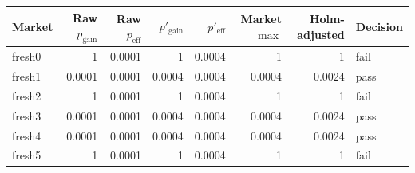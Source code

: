 \begin{tabular}{@{}lrrrrrrl@{}}\toprule
Market & Raw $p_{\mathrm{gain}}$ & Raw $p_{\mathrm{eff}}$ & $p'_{\mathrm{gain}}$ & $p'_{\mathrm{eff}}$ & Market $\max$ & Holm-adjusted & Decision \\\midrule
fresh0 & 1 & 0.0001 & 1 & 0.0004 & 1 & 1 & fail \\
fresh1 & 0.0001 & 0.0001 & 0.0004 & 0.0004 & 0.0004 & 0.0024 & pass \\
fresh2 & 1 & 0.0001 & 1 & 0.0004 & 1 & 1 & fail \\
fresh3 & 0.0001 & 0.0001 & 0.0004 & 0.0004 & 0.0004 & 0.0024 & pass \\
fresh4 & 0.0001 & 0.0001 & 0.0004 & 0.0004 & 0.0004 & 0.0024 & pass \\
fresh5 & 1 & 0.0001 & 1 & 0.0004 & 1 & 1 & fail \\
\bottomrule\end{tabular}
